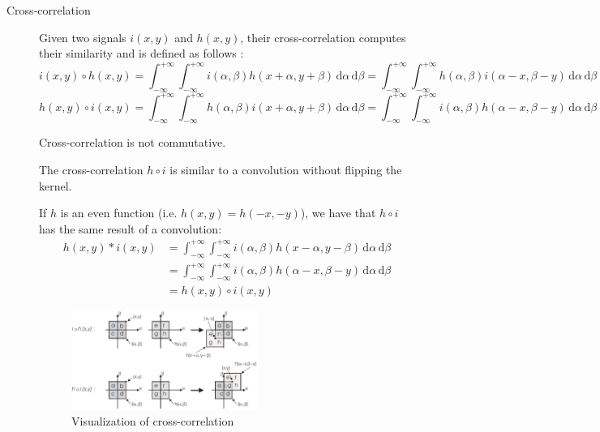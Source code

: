 \begin{description}
    \item[Cross-correlation] 
        Given two signals $i(x, y)$ and $h(x, y)$,
        their cross-correlation computes their similarity and is defined as follows \cite{wiki:crosscorrelation}:
        \[ 
            i(x, y) \circ h(x, y) = 
            \int_{-\infty}^{+\infty}\int_{-\infty}^{+\infty} i(\alpha, \beta) h(x+\alpha, y+\beta) \,\text{d}\alpha\,\text{d}\beta =
            \int_{-\infty}^{+\infty}\int_{-\infty}^{+\infty} h(\alpha, \beta) i(\alpha-x, \beta-y) \,\text{d}\alpha\,\text{d}\beta 
        \]
        \[ 
            h(x, y) \circ i(x, y) = 
            \int_{-\infty}^{+\infty}\int_{-\infty}^{+\infty} h(\alpha, \beta) i(x+\alpha, y+\beta) \,\text{d}\alpha\,\text{d}\beta =
            \int_{-\infty}^{+\infty}\int_{-\infty}^{+\infty} i(\alpha, \beta) h(\alpha-x, \beta-y) \,\text{d}\alpha\,\text{d}\beta 
        \]

        \begin{remark}
            Cross-correlation is not commutative.
        \end{remark}

        \begin{remark}
            The cross-correlation $h \circ i$ is similar to a convolution without flipping the kernel.

            If $h$ is an even function (i.e. $h(x, y) = h(-x, -y)$), we have that $h \circ i$ has the same result of a convolution:
            \begin{align*}
                h(x, y) * i(x, y) &= \int_{-\infty}^{+\infty} \int_{-\infty}^{+\infty} i(\alpha, \beta)h(x-\alpha, y-\beta) \,\text{d}\alpha\,\text{d}\beta \\
                    &= \int_{-\infty}^{+\infty} \int_{-\infty}^{+\infty} i(\alpha, \beta)h(\alpha-x, \beta-y) \,\text{d}\alpha\,\text{d}\beta 
                    \\
                    &= h(x, y) \circ i(x, y)
            \end{align*}
        \end{remark}

        \begin{figure}[H]
            \centering
            \includegraphics[width=0.6\textwidth]{./img/crosscorrelation_graphical.png}
            \caption{Visualization of cross-correlation}
        \end{figure}
\end{description}


